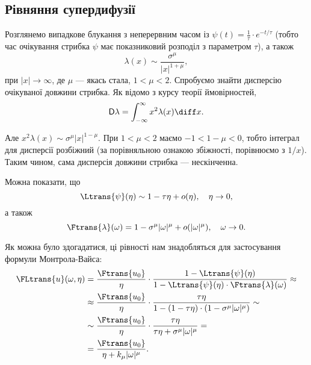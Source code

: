 \subsection{Рівняння супердифузії}

Розглянемо випадкове блукання з неперервним часом із $\psi(t) = \frac{1}{\tau} \cdot e^{-t/\tau}$ (тобто час очікування стрибка $\psi$ має показниковий розподіл з параметром $\tau$), а також
\begin{equation}
    \lambda(x) \sim \frac{\sigma^\mu}{|x|^{1 + \mu}}, 
\end{equation}
при $|x| \to \infty$, де $\mu$ --- якась стала, $1 < \mu < 2$. Спробуємо знайти дисперсію очікуваної довжини стрибка. Як відомо з курсу теорії ймовірностей,
\begin{equation}
    \mathsf{D} \lambda = \int_{-\infty}^\infty x^2 \lambda(x) \diff x.
\end{equation}

Але $x^2 \lambda(x) \sim \sigma^\mu |x|^{1 - \mu}$. При $1 < \mu < 2$ маємо $-1 < 1 - \mu < 0$, тобто інтеграл для дисперсії розбіжний (за порівняльною ознакою збіжності, порівнюємо з $1/x$). Таким чином, сама дисперсія довжини стрибка --- нескінченна. \medskip

Можна показати, що
\begin{equation}
    \Ltrans{\psi}(\eta) \sim 1 - \tau \eta + o(\eta), \quad \eta \to 0,
\end{equation}
а також
\begin{equation}
    \Ftrans{\lambda}(\omega) = 1 - \sigma^\mu |\omega|^\mu + o(|\omega|^\mu), \quad \omega \to 0.
\end{equation}

Як можна було здогадатися, ці рівності нам знадобляться для застосування формули Монтрола-Вайса:
\begin{equation}
    \begin{aligned}
        \FLtrans{u}(\omega, \eta)
        &= \frac{\Ftrans{u_0}}{\eta} \cdot \frac{1 - \Ltrans{\psi}(\eta)}{1 - \Ltrans{\psi}(\eta) \cdot \Ftrans{\lambda}(\omega)} \approx \\
        &\approx \frac{\Ftrans{u_0}}{\eta} \cdot \frac{\tau \eta}{1 - (1 - \tau \eta) \cdot (1 - \sigma^\mu |\omega|^\mu)} \sim \\
        &\sim \frac{\Ftrans{u_0}}{\eta} \cdot \frac{\tau \eta}{\tau \eta + \sigma^\mu |\omega|^\mu} = \\
        &= \frac{\Ftrans{u_0}}{\eta + k_\mu |\omega|^\mu}.
    \end{aligned}
\end{equation}

